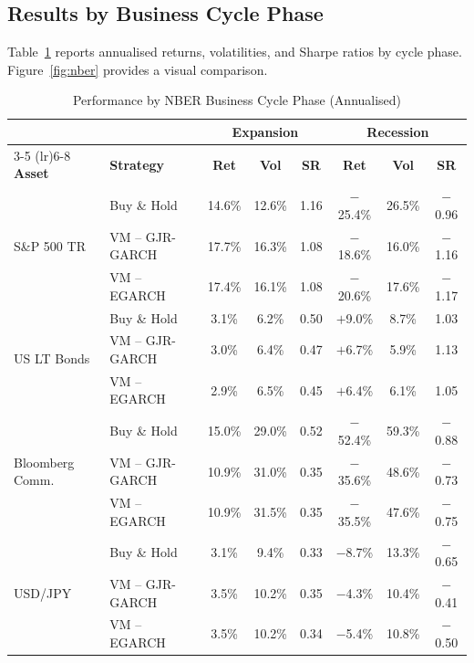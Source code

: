\documentclass[12pt, a4paper]{article}
\begin{document}
\subsection{Results by Business Cycle Phase}

Table~\ref{tab:nber} reports annualised returns, volatilities, and Sharpe ratios by
cycle phase. Figure~\ref{fig:nber} provides a visual comparison.

\begin{table}[H]
  \centering
  \caption{Performance by NBER Business Cycle Phase (Annualised)}
  \label{tab:nber}
  \footnotesize
  \begin{tabular}{llcccccc}
    \toprule
    & & \multicolumn{3}{c}{\textbf{Expansion}} & \multicolumn{3}{c}{\textbf{Recession}} \\
    \cmidrule(lr){3-5} \cmidrule(lr){6-8}
    \textbf{Asset} & \textbf{Strategy}
      & \textbf{Ret} & \textbf{Vol} & \textbf{SR}
      & \textbf{Ret} & \textbf{Vol} & \textbf{SR} \\
    \midrule
    \multirow{3}{*}{S\&P 500 TR}
      & Buy \& Hold      & 14.6\% & 12.6\% & 1.16  & $-$25.4\% & 26.5\% & $-$0.96 \\
      & VM -- GJR-GARCH  & 17.7\% & 16.3\% & 1.08  & $-$18.6\% & 16.0\% & $-$1.16 \\
      & VM -- EGARCH     & 17.4\% & 16.1\% & 1.08  & $-$20.6\% & 17.6\% & $-$1.17 \\
    \midrule
    \multirow{3}{*}{US LT Bonds}
      & Buy \& Hold      & 3.1\%  & 6.2\% & 0.50  &  $+$9.0\% & 8.7\% & 1.03 \\
      & VM -- GJR-GARCH  & 3.0\%  & 6.4\% & 0.47  &  $+$6.7\% & 5.9\% & 1.13 \\
      & VM -- EGARCH     & 2.9\%  & 6.5\% & 0.45  &  $+$6.4\% & 6.1\% & 1.05 \\
    \midrule
    \multirow{3}{*}{Bloomberg Comm.}
      & Buy \& Hold      & 15.0\% & 29.0\% & 0.52 & $-$52.4\% & 59.3\% & $-$0.88 \\
      & VM -- GJR-GARCH  & 10.9\% & 31.0\% & 0.35 & $-$35.6\% & 48.6\% & $-$0.73 \\
      & VM -- EGARCH     & 10.9\% & 31.5\% & 0.35 & $-$35.5\% & 47.6\% & $-$0.75 \\
    \midrule
    \multirow{3}{*}{USD/JPY}
      & Buy \& Hold      & 3.1\%  & 9.4\%  &  0.33 & $-$8.7\% & 13.3\% & $-$0.65 \\
      & VM -- GJR-GARCH  & 3.5\%  & 10.2\% &  0.35 & $-$4.3\% & 10.4\% & $-$0.41 \\
      & VM -- EGARCH     & 3.5\%  & 10.2\% &  0.34 & $-$5.4\% & 10.8\% & $-$0.50 \\

\end{tabular}
\end{table}
\end{document}
